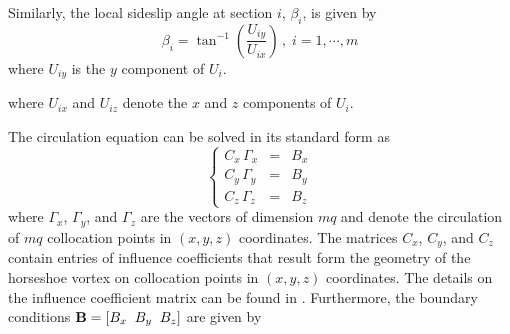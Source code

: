 \documentclass[11pt]{ucthesis}
\begin{document}
Similarly, the local sideslip angle at section $i$, $\beta_i$, is given by 
\begin{equation}
\beta_{i} = \tan^{-1} \left (\frac{U_{iy}}{U_{ix}} \right) \,,\;i=1,\cdots, m
\label{eqn:beta_aero}
\end{equation}
where $U_{iy}$ is the $y$ component of $U_i$.

where $U_{ix}$ and $U_{iz}$ denote the $x$ and $z$ components of $U_{i}$. 

The circulation equation can be solved in its standard form as \cite{melin2000vortex}
\begin{equation}	\label{eqn:RHSGamma}
\left \{
\begin{array}{rll}
C_x \, \Gamma_x & = & B_x \\
C_y \, \Gamma_y & = & B_y \\
C_z \, \Gamma_z & = & B_z
\end{array}
\right .
\end{equation}
where $\Gamma_x$, $\Gamma_y$, and $\Gamma_z$ are the vectors of dimension $mq$ and denote the circulation of $mq$ collocation points in $(x,y,z)$ coordinates. The matrices $C_x$, $C_y$, and $C_z$ contain entries of influence coefficients that result form the geometry of the horseshoe vortex on collocation points in $(x,y,z)$ coordinates. The details on the influence coefficient matrix can be found in \cite{melin2000vortex}. Furthermore, the boundary conditions ${\bf B} = [B_x \;\; B_y \;\;B_z]$ are given by
\end{document}
